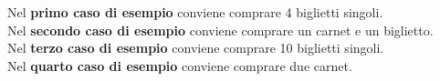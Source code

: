 \Examples
\begin{example}
%
\end{example}
\begin{example}
%
\end{example}
\begin{example}
%
\end{example}
\begin{example}
%
\end{example}


\Explanation
Nel \textbf{primo caso di esempio} conviene comprare 4 biglietti singoli.\\[2mm]
Nel \textbf{secondo caso di esempio} conviene comprare un carnet e un biglietto.\\[2mm]
Nel \textbf{terzo caso di esempio} conviene comprare 10 biglietti singoli.\\[2mm]
Nel \textbf{quarto caso di esempio} conviene comprare due carnet.
